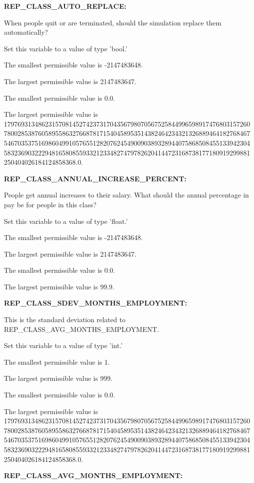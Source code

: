 \textbf{REP\_CLASS\_AUTO\_REPLACE:}


When people quit or are terminated, should the simulation replace them automatically?

Set this variable to a value of type 'bool.'

The smallest permissible value is -2147483648.

The largest permissible value is 2147483647.

The smallest permissible value is 0.0.

The largest permissible value is 179769313486231570814527423731704356798070567525844996598917476803157260780028538760589558632766878171540458953514382464234321326889464182768467546703537516986049910576551282076245490090389328944075868508455133942304583236903222948165808559332123348274797826204144723168738177180919299881250404026184124858368.0.


\textbf{REP\_CLASS\_ANNUAL\_INCREASE\_PERCENT:}


People get annual increases to their salary.  What should the annual percentage in pay be for people in this class?

Set this variable to a value of type 'float.'

The smallest permissible value is -2147483648.

The largest permissible value is 2147483647.

The smallest permissible value is 0.0.

The largest permissible value is 99.9.


\textbf{REP\_CLASS\_SDEV\_MONTHS\_EMPLOYMENT:}


This is the standard deviation related to REP\_CLASS\_AVG\_MONTHS\_EMPLOYMENT.

Set this variable to a value of type 'int.'

The smallest permissible value is 1.

The largest permissible value is 999.

The smallest permissible value is 0.0.

The largest permissible value is 179769313486231570814527423731704356798070567525844996598917476803157260780028538760589558632766878171540458953514382464234321326889464182768467546703537516986049910576551282076245490090389328944075868508455133942304583236903222948165808559332123348274797826204144723168738177180919299881250404026184124858368.0.


\textbf{REP\_CLASS\_AVG\_MONTHS\_EMPLOYMENT:}


